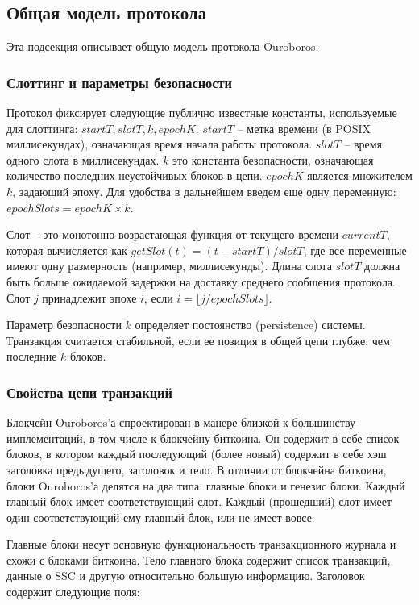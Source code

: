 \documentclass[]{itmo-student-thesis}
\begin{document}
\subsection{Общая модель протокола}

Эта подсекция описывает общую модель протокола Ouroboros.

\subsubsection{Слоттинг и параметры безопасности}

Протокол фиксирует следующие публично известные константы,
используемые для слоттинга: $startT, slotT, k, epochK$. $startT$ --
метка времени (в POSIX миллисекундах), означающая время начала работы
протокола. $slotT$ -- время одного слота в миллисекундах. $k$ это
константа безопасности, означающая количество последних неустойчивых
блоков в цепи. $epochK$ является множителем $k$, задающий эпоху. Для
удобства в дальнейшем введем еще одну переменную: $epochSlots = epochK
\times k$.

Слот -- это монотонно возрастающая функция от текущего времени
$currentT$, которая вычисляется как $getSlot(t) = (t - startT) /
slotT$, где все переменные имеют одну размерность (например,
миллисекунды). Длина слота $slotT$ должна быть больше ожидаемой
задержки на доставку среднего сообщения протокола.  Слот $j$
принадлежит эпохе $i$, если $i = \lfloor j / epochSlots \rfloor$.

Параметр безопасности $k$ определяет постоянство (persistence)
системы. Транзакция считается стабильной, если ее позиция в общей цепи
глубже, чем последние $k$ блоков.

\subsubsection{Свойства цепи транзакций}

Блокчейн Ouroboros'а спроектирован в манере близкой к большинству
имплементаций, в том числе к блокчейну биткоина. Он содержит в себе
список блоков, в котором каждый последующий (более новый) содержит в
себе хэш заголовка предыдущего, заголовок и тело. В отличии от
блокчейна биткоина, блоки Ouroboros'а делятся на два типа: главные
блоки и генезис блоки. Каждый главный блок имеет соответствующий
слот. Каждый (прошедший) слот имеет один соответствующий ему главный
блок, или не имеет вовсе.

Главные блоки несут основную функциональность транзакционного журнала
и схожи с блоками биткоина. Тело главного блока содержит список
транзакций, данные о SSC и другую относительно большую
информацию. Заголовок содержит следующие поля:
\end{document}
